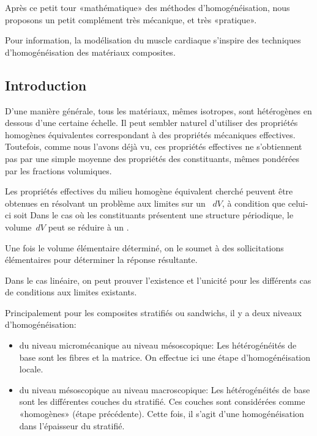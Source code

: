 Après ce petit tour «mathématique» des méthodes d'homogénéisation, nous proposons un petit complément très mécanique, et très «pratique».

\medskip
Pour information, la modélisation du muscle cardiaque s'inspire des techniques d'homogénéisation des matériaux composites.


\medskip
\subsection{Introduction}

D'une manière générale, tous les matériaux, mêmes isotropes, sont hétérogènes en dessous d'une certaine échelle. Il peut sembler naturel d'utiliser des propriétés homogènes équivalentes correspondant à des propriétés mécaniques effectives. Toutefois, comme nous l'avons déjà vu, ces propriétés effectives ne s'obtiennent pas par une simple moyenne des propriétés des constituants, mêmes pondérées par les fractions volumiques.

\medskip
Les propriétés effectives du milieu homogène équivalent cherché peuvent être obtenues en résolvant un problème aux limites sur un ~$dV$, à condition que celui-ci soit  Dans le cas où les constituants présentent une structure périodique, le volume~$dV$ peut se réduire à un .

\medskip
Une fois le volume élémentaire déterminé, on le soumet à des sollicitations élémentaires pour déterminer la réponse résultante. 

\medskip
Dans le cas linéaire, on peut prouver l'existence et l'unicité pour les différents cas de conditions aux limites existants.

\medskip
Principalement pour les composites stratifiés ou sandwichs, il y a deux niveaux d'homogénéisation:
\begin{itemize}
	\item du niveau micromécanique au niveau mésoscopique:
		Les hétérogénéités de base sont les fibres et la matrice. On effectue ici
		 une étape d'homogénéisation locale.
	\item du niveau mésoscopique au niveau macroscopique:
		Les hétérogénéités de base sont les différentes couches du stratifié.
		 Ces couches sont considérées comme «homogènes» (étape précédente).
		 Cette fois, il s'agit d'une homogénéisation dans l'épaisseur du stratifié.
\end{itemize}




